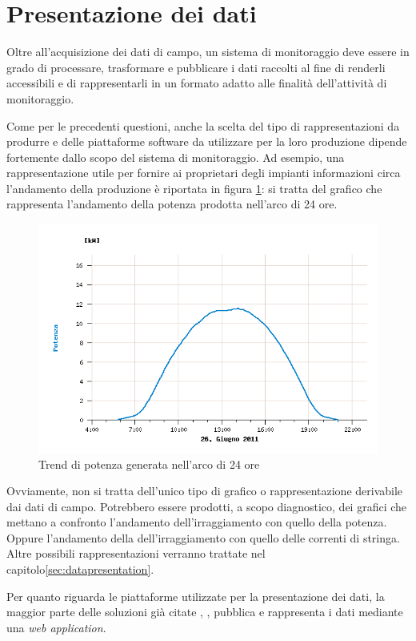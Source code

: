 \section{Presentazione dei dati}
Oltre all'acquisizione dei dati di campo, un sistema di monitoraggio deve essere in grado
di processare, trasformare e pubblicare i dati raccolti al fine di renderli accessibili e 
di rappresentarli in un formato adatto alle finalit\`a dell'attivit\`a di monitoraggio.
%

%
Come per le precedenti questioni, anche la scelta del tipo di rappresentazioni da produrre 
e delle piattaforme software da utilizzare per la loro produzione dipende fortemente 
dallo scopo del sistema di monitoraggio.
%
Ad esempio, una rappresentazione utile per fornire ai proprietari degli impianti 
informazioni circa l'andamento della produzione \`e riportata in figura 
\ref{esempiopotenza}: si tratta del grafico che rappresenta l'andamento della 
potenza prodotta nell'arco di 24 ore.
%
\begin{figure}[!hpb]
\centering
\includegraphics[width=350pt]{img/fv-trend-potenza.jpg}
\caption{Trend di potenza generata nell'arco di 24 ore}
\label{esempiopotenza}
\end{figure}
%

%
Ovviamente, non si tratta dell'unico tipo di grafico o rappresentazione derivabile dai 
dati di campo. Potrebbero essere prodotti, a scopo diagnostico, dei grafici che mettano a 
confronto l'andamento dell'irraggiamento con quello della potenza. Oppure l'andamento 
della dell'irraggiamento con quello delle correnti di stringa.
%
Altre possibili rappresentazioni verranno trattate nel capitolo\ref{sec:datapresentation}.
%

%
Per quanto riguarda le piattaforme utilizzate per la presentazione dei dati, la
maggior parte delle soluzioni gi\`a citate \cite{kolodenny06}, \cite{xiaoli11}, 
\cite{dirks06} pubblica e rappresenta i dati mediante una \emph{web application}.


